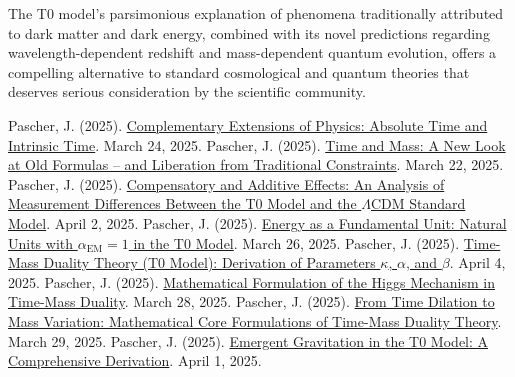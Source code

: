 \documentclass[12pt,a4paper]{article}
\newcommand{\alphaEM}{\alpha_{\text{EM}}}
\begin{document}
	The T0 model's parsimonious explanation of phenomena traditionally attributed to dark matter and dark energy, combined with its novel predictions regarding wavelength-dependent redshift and mass-dependent quantum evolution, offers a compelling alternative to standard cosmological and quantum theories that deserves serious consideration by the scientific community.
	
	\begin{thebibliography}{99}
		 Pascher, J. (2025). \href{https://github.com/jpascher/T0-Time-Mass-Duality/tree/main/2/pdf/English/KomplementPhysikZeitEn.pdf}{Complementary Extensions of Physics: Absolute Time and Intrinsic Time}. March 24, 2025.
		 Pascher, J. (2025). \href{https://github.com/jpascher/T0-Time-Mass-Duality/tree/main/2/pdf/English/ZeitMasseNeuerBlickEn.pdf}{Time and Mass: A New Look at Old Formulas – and Liberation from Traditional Constraints}. March 22, 2025.
		 Pascher, J. (2025). \href{https://github.com/jpascher/T0-Time-Mass-Duality/tree/main/2/pdf/English/MessdifferenzenT0StandardEn.pdf}{Compensatory and Additive Effects: An Analysis of Measurement Differences Between the T0 Model and the \(\Lambda\)CDM Standard Model}. April 2, 2025.
		 Pascher, J. (2025). \href{https://github.com/jpascher/T0-Time-Mass-Duality/tree/main/2/pdf/English/NatEinheitenAlpha1En.pdf}{Energy as a Fundamental Unit: Natural Units with \(\alphaEM = 1\) in the T0 Model}. March 26, 2025.
		 Pascher, J. (2025). \href{https://github.com/jpascher/T0-Time-Mass-Duality/tree/main/2/pdf/English/ZeitMasseT0ParamsEn.pdf}{Time-Mass Duality Theory (T0 Model): Derivation of Parameters \(\kappa\), \(\alpha\), and \(\beta\)}. April 4, 2025.
		 Pascher, J. (2025). \href{https://github.com/jpascher/T0-Time-Mass-Duality/tree/main/2/pdf/English/MathHiggsZeitMasseEn.pdf}{Mathematical Formulation of the Higgs Mechanism in Time-Mass Duality}. March 28, 2025.
		 Pascher, J. (2025). \href{https://github.com/jpascher/T0-Time-Mass-Duality/tree/main/2/pdf/English/MathZeitMasseLagrangeEn.pdf}{From Time Dilation to Mass Variation: Mathematical Core Formulations of Time-Mass Duality Theory}. March 29, 2025.
		 Pascher, J. (2025). \href{https://github.com/jpascher/T0-Time-Mass-Duality/tree/main/2/pdf/English/EmergentGravT0En.pdf}{Emergent Gravitation in the T0 Model: A Comprehensive Derivation}. April 1, 2025.

\end{thebibliography}
\end{document}
